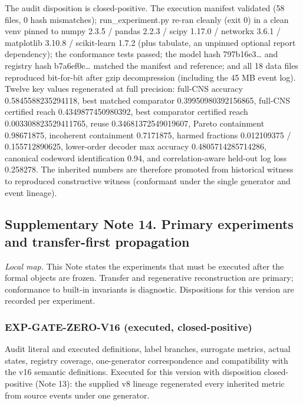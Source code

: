 The audit disposition is closed-positive. The execution manifest
validated (58 files, 0 hash mismatches); run\_experiment.py re-ran
cleanly (exit 0) in a clean venv pinned to numpy 2.3.5 / pandas 2.2.3 /
scipy 1.17.0 / networkx 3.6.1 / matplotlib 3.10.8 / scikit-learn 1.7.2
(plus tabulate, an unpinned optional report dependency); the conformance
tests passed; the model hash 797b16e3\ldots{} and registry hash
b7a6ef0e\ldots{} matched the manifest and reference; and all 18 data
files reproduced bit-for-bit after gzip decompression (including the 45
MB event log). Twelve key values regenerated at full precision: full-CNS
accuracy 0.5845588235294118, best matched comparator
0.39950980392156865, full-CNS certified reach 0.4349877450980392, best
comparator certified reach 0.003308823529411765, reuse
0.34681372549019607, Pareto containment 0.98671875, incoherent
containment 0.7171875, harmed fractions 0.012109375 / 0.155712890625,
lower-order decoder max accuracy 0.4805714285714286, canonical codeword
identification 0.94, and correlation-aware held-out log loss 0.258278.
The inherited numbers are therefore promoted from historical witness to
reproduced constructive witness (conformant under the single generator
and event lineage).

\hypertarget{supplementary-note-14.-primary-experiments-and-transfer-first-propagation}{%
\subsection{Supplementary Note 14. Primary experiments and
transfer-first
propagation}\label{supplementary-note-14.-primary-experiments-and-transfer-first-propagation}}

\emph{Local map.} This Note states the experiments that must be executed
after the formal objects are frozen. Transfer and regenerative
reconstruction are primary; conformance to built-in invariants is
diagnostic. Dispositions for this version are recorded per experiment.

\hypertarget{exp-gate-zero-v16-executed-closed-positive}{%
\subsubsection{EXP-GATE-ZERO-V16 (executed,
closed-positive)}\label{exp-gate-zero-v16-executed-closed-positive}}

Audit literal and executed definitions, label branches, surrogate
metrics, actual states, registry coverage, one-generator correspondence
and compatibility with the v16 semantic definitions. Executed for this
version with disposition closed-positive (Note 13): the supplied v8
lineage regenerated every inherited metric from source events under one
generator.

